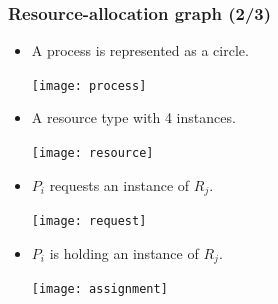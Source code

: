 \documentclass[CJKutf8,xcolor=pdftex,dvipsnames,table]{beamer}
\begin{document}
\begin{CJK*}{UTF8}{song}
  \begin{frame}
  \frametitle{Resource-allocation graph (2/3)} \pause
  \begin{itemize}
  \item{A process is represented as a circle.} \pause
    \begin{center}
      \texttt{[image: process]} \pause
    \end{center}
  \item{A resource type with 4 instances.} \pause
    \begin{center}
      \texttt{[image: resource]} \pause
    \end{center}
  \item{$P_i$ requests an instance of $R_j$.} \pause
    \begin{center}
      \texttt{[image: request]} \pause
    \end{center}
  \item{$P_i$ is holding an instance of $R_j$.}
    \begin{center}
      \texttt{[image: assignment]}
    \end{center}
  \end{itemize}
  \end{frame}


\end{CJK*}
\end{document}
